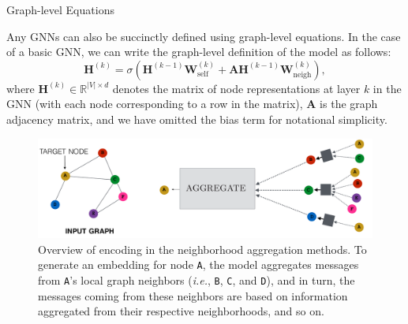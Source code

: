 \documentclass[10pt, aspectratio=169, compress, protectframetitle, handout]{beamer}
\begin{document}
\begin{frame}{Graph-level Equations}
    
    Any GNNs can also be succinctly defined using \alert{graph-level equations}. In the case of a basic GNN, we can write the graph-level definition of the model as follows:
    \begin{equation}
        \mathbf H^{(k)} = \sigma \left( \mathbf H^{(k-1)} \mathbf W_\text{self}^{(k)} + \mathbf{A H}^{(k-1)} \mathbf W_\text{neigh}^{(k)} \right),
    \end{equation}
    where $\mathbf H^{(k)} \in \mathbb R^{|V| \times d}$ denotes the matrix of node representations at layer $k$ in the GNN (with each node corresponding to a row in the matrix), $\mathbf A$ is the graph adjacency matrix, and we have omitted the bias term for notational simplicity.
    
    \begin{figure}
        \begin{minipage}{0.49\textwidth}
            \caption{Overview of encoding in the neighborhood aggregation methods.
            To generate an embedding for node \texttt{A}, the model aggregates messages from \texttt{A}'s local graph neighbors (\textit{i.e.}, \texttt{B}, \texttt{C}, and \texttt{D}), and in turn, the messages coming from these neighbors are based on information aggregated from their respective neighborhoods, and so on.
        }
        \end{minipage}
        \begin{minipage}[c]{0.49\textwidth}\hfill
            \includegraphics[width=1.1\textwidth]{neigh_agg_new.pdf}
        \end{minipage}
        \label{fig:neigh_agg}
    \end{figure}
    
\end{frame}
\end{document}
